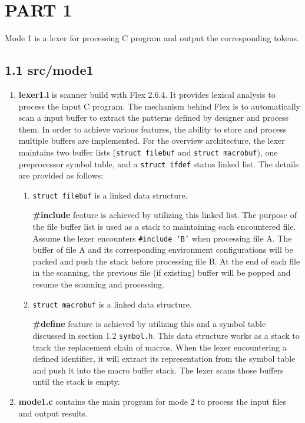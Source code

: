 \section*{PART 1}

Mode 1 is a lexer for processing C program and output the corresponding tokens.

\subsection*{1.1 \large\textbf{src/mode1}}
\begin{enumerate}
    \item \textbf{lexer1.l} is scanner build with Flex 2.6.4. It provides lexical analysis to process the input C program. The mechanism behind Flex is to automatically scan a input buffer to extract the patterns defined by designer and process them. In order to achieve various features, the ability to store and process multiple buffers are implemented. For the overview architecture, the lexer maintains two buffer lists (\texttt{struct filebuf} and \texttt{struct macrobuf}), one preprocessor symbol table, and a \texttt{struct ifdef} status linked list. The details are provided as follows:
    
    \begin{enumerate} 
        \item \texttt{struct filebuf} is a linked data structure.

        \textbf{\#include} feature is achieved by utilizing this linked list. The purpose of the file buffer list is used as a stack to maintaining each encountered file. Assume the lexer encounters \texttt{\#include 'B'} when processing file A. The buffer of file A and its corresponding environment configurations will be packed and push the stack before processing file B. At the end of each file in the scanning, the previous file (if existing) buffer will be popped and resume the scanning and processing.

        \item \texttt{struct macrobuf} is a linked data structure.

        \textbf{\#define} feature is achieved by utilizing this and a symbol table discussed in section 1.2 \texttt{symbol.h}. This data structure works as a stack to track the replacement chain of macros. When the lexer encountering a defined identifier, it will extract its representation from the symbol table and push it into the macro buffer stack. The lexer scans those buffers until the stack is empty. 

    \end{enumerate}

    \item \textbf{mode1.c} contains the main program for mode 2 to process the input files and output results.
\end{enumerate}

